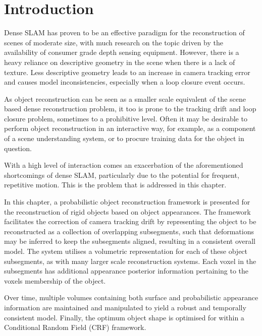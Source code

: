 
\section{Introduction}
\label{sec:probobj_introduction}
Dense SLAM has proven to be an effective paradigm for the reconstruction of 
scenes of moderate size, with much research on the topic driven by the 
availability of consumer grade depth sensing equipment. However, there is a 
heavy reliance on descriptive geometry in the scene when there is a lack of 
texture. Less descriptive geometry leads to an increase in camera tracking 
error and causes model inconsistencies, especially when a loop closure event 
occurs.

As object reconstruction can be seen as a smaller scale equivalent of the scene
based dense reconstruction problem, it too is prone to the tracking drift and
loop closure problem, sometimes to a prohibitive level. Often it may be
desirable to perform object reconstruction in an interactive way, for example,
as a component of a scene understanding system, or to procure training data for
the object in question.

With a high level of interaction comes an exacerbation of the aforementioned
shortcomings of dense SLAM, particularly due to the potential for frequent,
repetitive motion. This is the problem that is addressed in this chapter.

In this chapter, a probabilistic object reconstruction framework is presented
for the reconstruction of rigid objects based on object appearances.
The framework facilitates the correction of camera tracking drift by
representing the object to be reconstructed as a collection of overlapping
subsegments, such that deformations may be inferred to keep the subsegments
aligned, resulting in a consistent overall model. The system utilises a
volumetric representation for each of these object subsegments, as with many
larger scale reconstruction systems. Each voxel in the subsegments has
additional appearance posterior information pertaining to the voxels membership
of the object.

Over time, multiple volumes containing both surface and probabilistic appearance
information are maintained and manipulated to yield a robust and temporally
consistent model. Finally, the optimum object shape is optimised for within a 
Conditional Random Field (CRF) \cite{CRF} framework.


